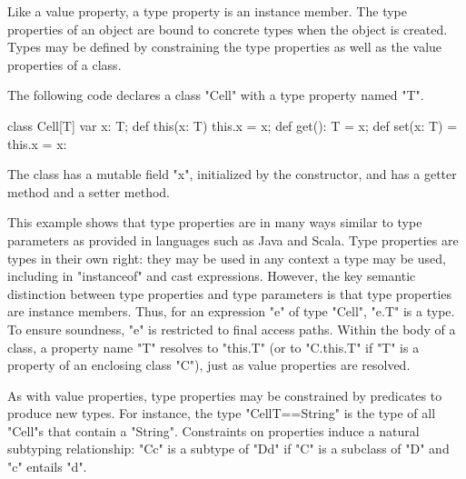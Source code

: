 Like a value property, a type property is an instance member.
The type properties of an object are bound to concrete types
when the object is
created.
Types may be defined by constraining the type properties as
well as the value properties of a class.

The following code declares a class \xcd"Cell" with a type
property named \xcd"T".
\begin{xten}
class Cell[T] {
    var x: T;
    def this(x: T) { this.x = x; }
    def get(): T = x;
    def set(x: T) = { this.x = x: }
}
\end{xten}
The class has a mutable field \xcd"x", initialized by the
constructor, and has a getter method and a setter method.

This example shows that type properties are in many ways similar to
type parameters as provided in languages such as Java and Scala.
Type properties are types in their own right:
they may be used in any context a type may be used,
including in \xcd"instanceof" and cast expressions.
However, the key semantic distinction between type properties
and type parameters is that type properties are instance
members.
Thus, for an expression \xcd"e" of type \xcd"Cell", \xcd"e.T" is a type. 
To ensure
soundness, \xcd"e" is restricted to final access paths.
Within the body of a class, a property name \xcd"T" resolves
to \xcd"this.T" (or to \xcd"C.this.T" if \xcd"T" is a property of
an enclosing class \xcd"C"), just as value properties are
resolved.

As with value properties, type properties may be constrained
by predicates to produce new types.
For instance, the type \xcd"Cell{T==String}" is the type of
all \xcd"Cell"s that contain a \xcd"String".
Constraints on properties induce a natural subtyping relationship:
\xcd"C{c}" is a subtype of
\xcd"D{d}" if \xcd"C" is a subclass of \xcd"D" and
\xcd"c" entails \xcd"d".

